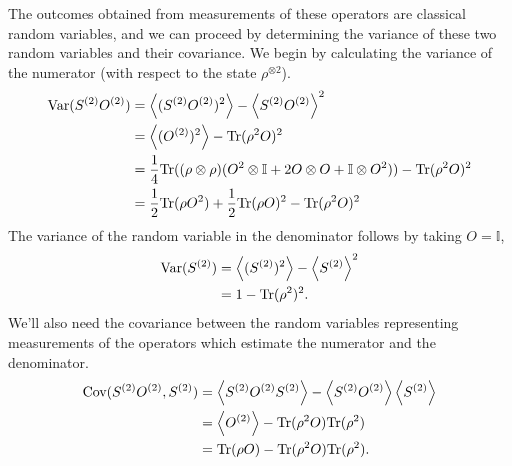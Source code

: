 \documentclass[
amsmath,
amssymb,
aps,
pra,
reprint,
twocolumn,
superscriptaddress,
longbibliography,
showkeys,
floatfix
]{revtex4-1}
\def\tr{\mathrm{Tr}}
\begin{document}
The outcomes obtained from measurements of these operators are classical random
variables, and we can proceed by determining the variance of these two random
variables and their covariance. 
We begin by calculating the variance of the numerator (with respect to the state
\(\rho^{\otimes 2}\)).
\begin{align}
  \textrm{Var}(S^{(2)}O^{(2)}) &= \ev{(S^{(2)} O^{(2)})^2} - \ev{S^{(2)} O^{(2)}}^2 \\
                      &= \ev{(O^{(2)})^2} - \tr(\rho^2 O)^2 \\
                      &= \frac{1}{4}\tr((\rho \otimes \rho) (O^2 \otimes \mathbb{I} + 2 O \otimes O
                        + \mathbb{I} \otimes O^{2})) - \tr(\rho^2 O)^2 \\
                      &= \frac{1}{2}\tr(\rho O^2) + \frac{1}{2}\tr(\rho O)^2 - \tr(\rho^2 O) ^2
\end{align}
The variance of the random variable in the denominator follows by taking \(O =
\mathbb{I}\),
\begin{align}
  \textrm{Var}(S^{(2)}) &= \ev{(S^{(2)})^2} - \ev{S^{(2)}}^2 \\
               &= 1 - \tr(\rho^2)^2.
\end{align}
We'll also need the covariance between the random variables representing
measurements of the operators which estimate the numerator and the denominator.
\begin{align}
  \textrm{Cov}(S^{(2)}O^{(2)}, S^{(2)}) &= \ev{S^{(2)} O^{(2)} S^{(2)}} - \ev{S^{(2)}O^{(2)}}\ev{S^{(2)}} \\
                               &= \ev{O^{(2)}} - \tr(\rho^2 O)\tr(\rho^2) \\
                               &= \tr(\rho O) - \tr(\rho^2 O)\tr(\rho^2).
\end{align}
\end{document}

